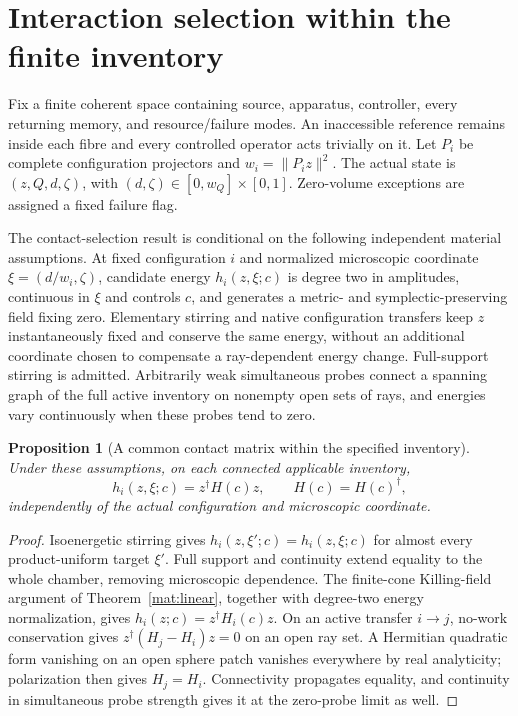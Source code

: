 \documentclass[11pt,oneside,openany]{book}
\newtheorem{proposition}[theorem]{Proposition}
\theoremstyle{definition}
\theoremstyle{remark}\newtheorem{remark}[theorem]{Remark}
\begin{document}
\section{Interaction selection within the finite inventory}

Fix a finite coherent space containing source, apparatus, controller, every returning memory, and resource/failure modes. An inaccessible reference remains inside each fibre and every controlled operator acts trivially on it. Let $P_i$ be complete configuration projectors and $w_i=\|P_i z\|^2$. The actual state is $(z,Q,d,\zeta)$, with $(d,\zeta)\in[0,w_Q]\times[0,1]$. Zero-volume exceptions are assigned a fixed failure flag.

The contact-selection result is conditional on the following independent material assumptions. At fixed configuration $i$ and normalized microscopic coordinate $\xi=(d/w_i,\zeta)$, candidate energy $h_i(z,\xi;c)$ is degree two in amplitudes, continuous in $\xi$ and controls $c$, and generates a metric- and symplectic-preserving field fixing zero. Elementary stirring and native configuration transfers keep $z$ instantaneously fixed and conserve the same energy, without an additional coordinate chosen to compensate a ray-dependent energy change. Full-support stirring is admitted. Arbitrarily weak simultaneous probes connect a spanning graph of the full active inventory on nonempty open sets of rays, and energies vary continuously when these probes tend to zero.

\begin{proposition}[A common contact matrix within the specified inventory]
\label{chamber:contact}
Under these assumptions, on each connected applicable inventory,
\[
 h_i(z,\xi;c)=z^\dagger H(c)z,\qquad H(c)=H(c)^\dagger,
\]
independently of the actual configuration and microscopic coordinate.
\end{proposition}
\begin{proof}
Isoenergetic stirring gives $h_i(z,\xi';c)=h_i(z,\xi;c)$ for almost every product-uniform target $\xi'$. Full support and continuity extend equality to the whole chamber, removing microscopic dependence. The finite-cone Killing-field argument of Theorem~\ref{mat:linear}, together with degree-two energy normalization, gives $h_i(z;c)=z^\dagger H_i(c)z$. On an active transfer $i\to j$, no-work conservation gives $z^\dagger(H_j-H_i)z=0$ on an open ray set. A Hermitian quadratic form vanishing on an open sphere patch vanishes everywhere by real analyticity; polarization then gives $H_j=H_i$. Connectivity propagates equality, and continuity in simultaneous probe strength gives it at the zero-probe limit as well.
\end{proof}
\end{document}
